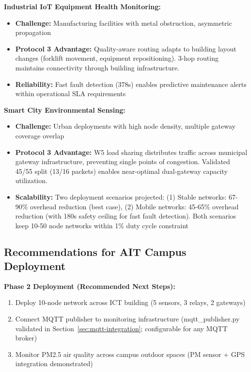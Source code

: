 \textbf{Industrial IoT Equipment Health Monitoring:}
\begin{itemize}
\item \textbf{Challenge:} Manufacturing facilities with metal obstruction, asymmetric propagation
\item \textbf{Protocol 3 Advantage:} Quality-aware routing adapts to building layout changes (forklift movement, equipment repositioning). 3-hop routing maintains connectivity through building infrastructure.
\item \textbf{Reliability:} Fast fault detection (378s) enables predictive maintenance alerts within operational SLA requirements
\end{itemize}

\textbf{Smart City Environmental Sensing:}
\begin{itemize}
\item \textbf{Challenge:} Urban deployments with high node density, multiple gateway coverage overlap
\item \textbf{Protocol 3 Advantage:} W5 load sharing distributes traffic across municipal gateway infrastructure, preventing single points of congestion. Validated 45/55 split (13/16 packets) enables near-optimal dual-gateway capacity utilization.
\item \textbf{Scalability:} Two deployment scenarios projected: (1) Stable networks: 67-90\% overhead reduction (best case), (2) Mobile networks: 45-65\% overhead reduction (with 180s safety ceiling for fast fault detection). Both scenarios keep 10-50 node networks within 1\% duty cycle constraint
\end{itemize}

\subsection{Recommendations for AIT Campus Deployment}

\textbf{Phase 2 Deployment (Recommended Next Steps):}
\begin{enumerate}
\item Deploy 10-node network across ICT building (5 sensors, 3 relays, 2 gateways)
\item Connect MQTT publisher to monitoring infrastructure (mqtt\_publisher.py validated in Section~\ref{sec:mqtt-integration}; configurable for any MQTT broker)
\item Monitor PM2.5 air quality across campus outdoor spaces (PM sensor + GPS integration demonstrated)
\end{enumerate}

